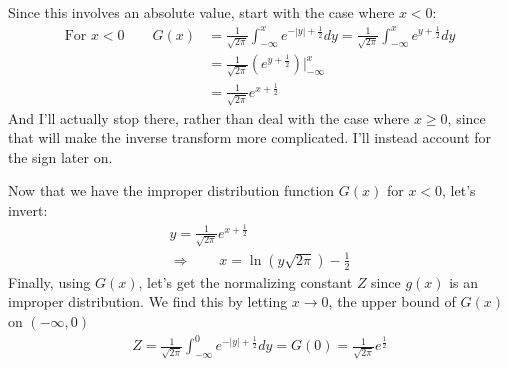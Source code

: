 \documentclass[12pt]{article}
\theoremstyle{plain}
\theoremstyle{definition}
\theoremstyle{remark}
\begin{document}
\begin{enumerate}
\begin{enumerate}
        Since this involves an absolute value, start with the case where
        $x < 0$:
        \begin{align*}
          \text{For $x< 0$} \qquad
          G(x) &= \frac{1}{\sqrt{2\pi}} \int^x_{-\infty} e^{-|y|+\frac{1}{2}} dy
          = \frac{1}{\sqrt{2\pi}} \int^x_{-\infty} e^{y+\frac{1}{2}} dy \\
          &= \frac{1}{\sqrt{2\pi}} \left(e^{y+\frac{1}{2}}\right) |^x_{-\infty} \\
          &= \frac{1}{\sqrt{2\pi}} e^{x+\frac{1}{2}}
        \end{align*}
        And I'll actually stop there, rather than deal with the case
        where $x\geq 0$, since that will make the inverse transform more
        complicated. I'll instead account for the sign later on.

        Now that we have the improper distribution function $G(x)$ for
        $x< 0$, let's invert:
        \begin{align*}
          y = \frac{1}{\sqrt{2\pi}} e^{x+\frac{1}{2}} \\
          \Rightarrow \qquad
          x = \ln(y\sqrt{2\pi}) - \frac{1}{2}
        \end{align*}
        Finally, using $G(x)$, let's get the normalizing constant $Z$ since
        $g(x)$ is an improper distribution. We find this by letting
        $x\rightarrow 0$, the upper bound of $G(x)$ on $(-\infty, 0)$
        \begin{align*}
          Z = \frac{1}{\sqrt{2\pi}} \int^0_{-\infty} e^{-|y|+\frac{1}{2}} dy
          = G(0) = \frac{1}{\sqrt{2\pi}} e^{\frac{1}{2}}
        \end{align*}

\end{enumerate}
\end{enumerate}
\end{document}
